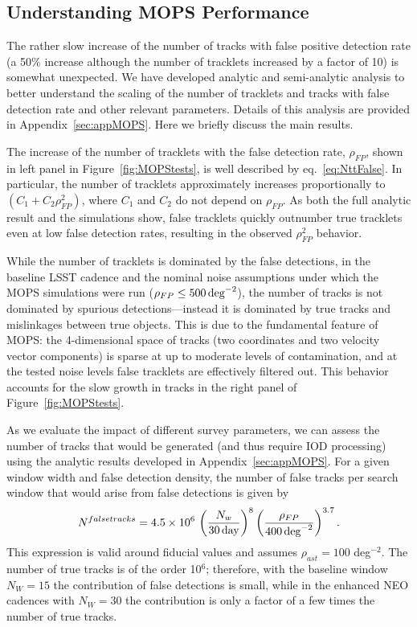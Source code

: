 \subsection{Understanding MOPS Performance}

The rather slow increase of the number of tracks with false positive detection rate (a 50\% increase
although the number of tracklets increased by a factor of 10) is somewhat unexpected. We have
developed analytic and semi-analytic analysis to better understand the scaling of the number of
tracklets and tracks with false detection rate and other relevant parameters. Details of this
analysis are provided in Appendix~\ref{sec:appMOPS}. Here we briefly discuss the main results.

The increase of the number of tracklets with the false detection rate,
$\rho_{FP}$, shown in left panel in Figure~\ref{fig:MOPStests}, is well
described by eq.~\ref{eq:NttFalse}. In particular, the number of tracklets
approximately increases proportionally to $(C_1 + C_2\rho_{FP}^2)$, where $C_1$
and $C_2$ do not depend on $\rho_{FP}$. As both the full analytic result and the
simulations show, false tracklets quickly outnumber true tracklets even at low
false detection rates, resulting in the observed $\rho_{FP}^2$ behavior.

While the number of tracklets is dominated by the false detections, in the
baseline LSST cadence and the nominal noise assumptions under which the MOPS
simulations were run ($\rho_{FP} \leq 500\,\rm{deg}^{-2}$), the number of
tracks is not dominated by spurious detections---instead it is dominated by true
tracks and mislinkages between true objects. This is due to the fundamental
feature of MOPS: the 4-dimensional space of tracks (two coordinates and two
velocity vector components) is sparse at up to moderate levels of contamination,
and at the tested noise levels false tracklets are effectively filtered out. This
behavior accounts for the slow growth in tracks in the right panel of
Figure~\ref{fig:MOPStests}.

As we evaluate the impact of different survey parameters, we can assess the
number of tracks that would be generated (and thus require IOD processing) using
the analytic results developed in Appendix~\ref{sec:appMOPS}. For a given window
width and false detection density, the number of false tracks per search window
that would arise from false detections is given by
\begin{equation}
\label{eq:falsetracks2}
   N^{falsetracks} = 4.5 \times 10^6 \, \left( {N_w \over 30 \, {\rm day} } \right)^{8} \left( {\rho_{FP} \over 400 \, {\rm deg}^{-2} }\right)^{3.7}.
\end{equation}
This expression is valid around fiducial values and assumes $\rho_{ast}=100$ deg$^{-2}$.
The number of true tracks is of the order 10$^6$; therefore, with the baseline
window $N_W=15$ the contribution of false detections is small, while in the
enhanced NEO cadences with $N_W=30$ the contribution is only a factor of a few
times the number of true tracks.

